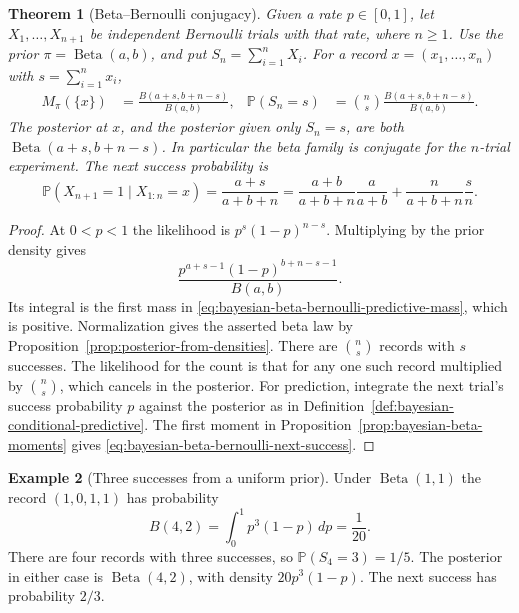 \documentclass[11pt,oneside]{book}
\newtheorem{theorem}{Theorem}[chapter]
\theoremstyle{definition}
\newtheorem{example}[theorem]{Example}
\theoremstyle{remark}
\begin{document}
\begin{theorem}[Beta--Bernoulli conjugacy]
\label{thm:bayesian-beta-bernoulli}
Given a rate $p\in[0,1]$, let $X_1,\ldots,X_{n+1}$ be independent
Bernoulli trials with that rate, where $n\geq1$. Use the prior
$\pi=\operatorname{Beta}(a,b)$, and put $S_n=\sum_{i=1}^n X_i$.
For a record $x=(x_1,\ldots,x_n)$ with $s=\sum_{i=1}^n x_i$,
\begin{align}
M_\pi(\{x\})&=\frac{B(a+s,b+n-s)}{B(a,b)},&
\mathbb P(S_n=s)&=\binom ns\frac{B(a+s,b+n-s)}{B(a,b)}.
\label{eq:bayesian-beta-bernoulli-predictive-mass}
\end{align}
The posterior at $x$, and the posterior given only $S_n=s$, are both
$\operatorname{Beta}(a+s,b+n-s)$. In particular the beta family is
conjugate for the $n$-trial experiment. The next success probability is
\begin{equation}
\mathbb P(X_{n+1}=1\mid X_{1:n}=x)
=\frac{a+s}{a+b+n}
=\frac{a+b}{a+b+n}\frac{a}{a+b}+\frac{n}{a+b+n}\frac{s}{n}.
\label{eq:bayesian-beta-bernoulli-next-success}
\end{equation}
\end{theorem}
\begin{proof}
At $0<p<1$ the likelihood is $p^s(1-p)^{n-s}$. Multiplying by the
prior density gives
\[
\frac{p^{a+s-1}(1-p)^{b+n-s-1}}{B(a,b)}.
\]
Its integral is the first mass in
\eqref{eq:bayesian-beta-bernoulli-predictive-mass}, which is positive.
Normalization gives the asserted beta law by
Proposition~\ref{prop:posterior-from-densities}. There are $\binom ns$
records with $s$ successes. The likelihood for the count is that
for any one such record multiplied by $\binom ns$, which cancels
in the posterior. For prediction, integrate the next trial's
success probability $p$ against the posterior as in
Definition~\ref{def:bayesian-conditional-predictive}. The first
moment in Proposition~\ref{prop:bayesian-beta-moments} gives
\eqref{eq:bayesian-beta-bernoulli-next-success}.
\end{proof}

\begin{example}[Three successes from a uniform prior]
\label{ex:bayesian-beta-uniform-record}
Under $\operatorname{Beta}(1,1)$ the record $(1,0,1,1)$ has
probability
\[
B(4,2)=\int_0^1 p^3(1-p)\,dp=\frac{1}{20}.
\]
There are four records with three successes, so
$\mathbb P(S_4=3)=1/5$. The posterior in either case is
$\operatorname{Beta}(4,2)$, with density $20p^3(1-p)$.
The next success has probability $2/3$.
\end{example}
\end{document}
